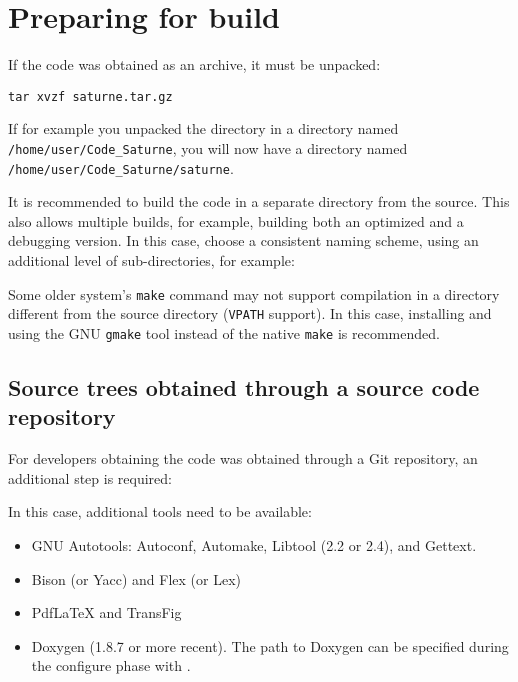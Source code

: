 \documentclass[a4paper,10pt,twoside]{csshortdoc}
\begin{document}
\section{Preparing for build\label{sec:prepare}}

If the code was obtained as an archive, it must be unpacked:

\texttt{tar xvzf saturne.tar.gz}

If for example you unpacked the directory in a directory
named \texttt{/home/user/Code\_Saturne}, you will now
have a directory named \texttt{/home/user/Code\_Saturne/saturne}.

It is recommended to build the code in a separate directory from the source.
This also allows multiple builds, for example, building both an
optimized and a debugging version. In this case, choose a consistent
naming scheme, using an additional level of sub-directories,
for example:


Some older system's {\tt make} command may not support compilation
in a directory different from the source directory ({\tt VPATH}
support). In this case, installing and using the GNU {\tt gmake}
tool instead of the native {\tt make} is recommended.

\subsection{Source trees obtained through a source code repository\label{sec:preparerepo}}

For developers obtaining the code was obtained through a Git repository,
an additional step is required:


In this case, additional tools need to be available:

\begin{itemize}
\item GNU Autotools: Autoconf, Automake, Libtool (2.2 or 2.4), and Gettext.
\item Bison (or Yacc) and Flex (or Lex)
\item PdfLaTeX and TransFig
\item Doxygen (1.8.7 or more recent). The path to Doxygen can be specified during
the configure phase with .
\end{itemize}
\end{document}
